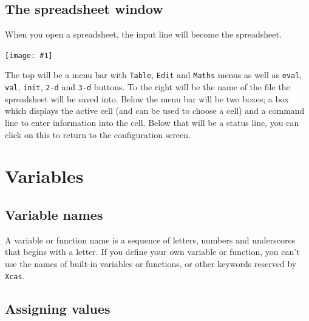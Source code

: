 \documentclass[a4paper,11pt]{book}
\newcommand{\includeimage}[1]
{\texttt{[image: \#1]}}
\begin{document}
\subsection{The spreadsheet window}

When you open a spreadsheet, the input line will become the
spreadsheet.
\begin{center}
\includeimage{xcas-spreadsheet.png}
\end{center}
The top will be a menu bar with
\texttt{Table}, \texttt{Edit} and \texttt{Maths} menus as well as
\texttt{eval}, \texttt{val}, \texttt{init}, \texttt{2-d} and
\texttt{3-d} buttons. To the right will be the name of
the file the spreadsheet will be saved into. Below the menu bar will
be two boxes; a box which displays the active cell (and can be used to
choose a cell) and a command line to enter information into the cell.
Below that will be a status line, you can click on this to return to
the configuration screen.


\section{Variables}

\subsection{Variable names}

A variable or function name is a sequence of letters,
numbers and underscores that begins with a letter.  If you define your
own variable or function, you can't use the names of built-in
variables or functions, or other keywords reserved by \texttt{Xcas}.


\subsection{Assigning values}
\end{document}
